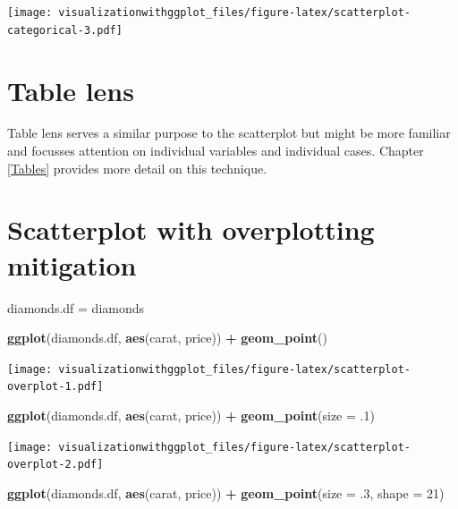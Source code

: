 \documentclass[]{krantz}
\makeatletter
\newenvironment{Shaded}{\begin{snugshade}}{\end{snugshade}}
\newcommand{\DataTypeTok}[1]{\textcolor[rgb]{0.13,0.29,0.53}{#1}}
\newcommand{\DecValTok}[1]{\textcolor[rgb]{0.00,0.00,0.81}{#1}}
\newcommand{\FloatTok}[1]{\textcolor[rgb]{0.00,0.00,0.81}{#1}}
\newcommand{\KeywordTok}[1]{\textcolor[rgb]{0.13,0.29,0.53}{\textbf{#1}}}
\newcommand{\NormalTok}[1]{#1}
\newcommand{\OperatorTok}[1]{\textcolor[rgb]{0.81,0.36,0.00}{\textbf{#1}}}
\newcommand{\StringTok}[1]{\textcolor[rgb]{0.31,0.60,0.02}{#1}}
\newenvironment{kframe}{%
\medskip{}
\setlength{\fboxsep}{.8em}
 \def\at@end@of@kframe{}%
 \ifinner\ifhmode%
  \def\at@end@of@kframe{\end{minipage}}%
  \begin{minipage}{\columnwidth}%
 \fi\fi%
 \def\FrameCommand##1{\hskip\@totalleftmargin \hskip-\fboxsep
 \colorbox{shadecolor}{##1}\hskip-\fboxsep
     \hskip-\linewidth \hskip-\@totalleftmargin \hskip\columnwidth}%
 \MakeFramed {\advance\hsize-\width
   \@totalleftmargin\z@ \linewidth\hsize
   \@setminipage}}%
 {\par\unskip\endMakeFramed%
 \at@end@of@kframe}
\renewenvironment{Shaded}{\begin{kframe}}{\end{kframe}}
\makeatother
\begin{document}
\texttt{[image: visualizationwithggplot\_files/figure-latex/scatterplot-categorical-3.pdf]}

\hypertarget{table-lens}{%
\section{Table lens}\label{table-lens}}

Table lens serves a similar purpose to the scatterplot but might be more familiar and focusses attention on individual variables and individual cases. Chapter \ref{Tables} provides more detail on this technique.

\hypertarget{htmlwidget-d56bae34a6f5d681e7ab}{}

\hypertarget{scatterplot-with-overplotting-mitigation}{%
\section{Scatterplot with overplotting mitigation}\label{scatterplot-with-overplotting-mitigation}}

\begin{Shaded}
\begin{Highlighting}[]
\NormalTok{diamonds.df =}\StringTok{ }\NormalTok{diamonds}

\KeywordTok{ggplot}\NormalTok{(diamonds.df, }\KeywordTok{aes}\NormalTok{(carat, price)) }\OperatorTok{+}
\StringTok{  }\KeywordTok{geom_point}\NormalTok{()}
\end{Highlighting}
\end{Shaded}

\texttt{[image: visualizationwithggplot\_files/figure-latex/scatterplot-overplot-1.pdf]}

\begin{Shaded}
\begin{Highlighting}[]
\KeywordTok{ggplot}\NormalTok{(diamonds.df, }\KeywordTok{aes}\NormalTok{(carat, price)) }\OperatorTok{+}
\StringTok{  }\KeywordTok{geom_point}\NormalTok{(}\DataTypeTok{size =} \FloatTok{.1}\NormalTok{)}
\end{Highlighting}
\end{Shaded}

\texttt{[image: visualizationwithggplot\_files/figure-latex/scatterplot-overplot-2.pdf]}

\begin{Shaded}
\begin{Highlighting}[]
\KeywordTok{ggplot}\NormalTok{(diamonds.df, }\KeywordTok{aes}\NormalTok{(carat, price)) }\OperatorTok{+}
\StringTok{  }\KeywordTok{geom_point}\NormalTok{(}\DataTypeTok{size =} \FloatTok{.3}\NormalTok{, }\DataTypeTok{shape =} \DecValTok{21}\NormalTok{)}
\end{Highlighting}
\end{Shaded}
\end{document}
